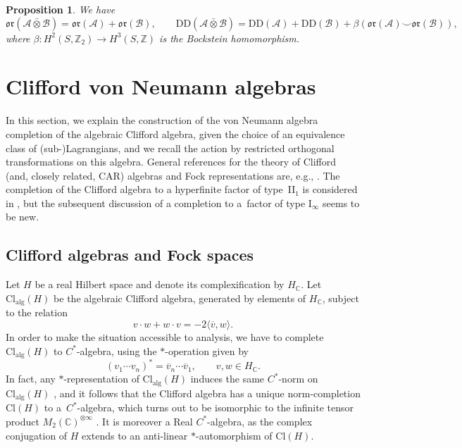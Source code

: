 \documentclass[10pt,a4paper]{amsart}
\numberwithin{equation}{section}
\newtheorem{Proposition}[Theorem]{Proposition}
\newcommand{\Z}{\mathbb{Z}}
\newcommand{\C}{\mathbb{C}}
\newcommand{\Cl}{\mathrm{Cl}}
\newcommand{\DD}{\mathrm{DD}}
\newcommand{\oclass}{\mathfrak{or}}
\begin{document}
\begin{Proposition} \label{PropTensorProductDD}
We have
\begin{equation*}
\oclass(\mathcal{A} \bar{\otimes}\mathcal{B}) = \oclass(\mathcal{A}) + \oclass(\mathcal{B}), \qquad \DD(\mathcal{A} \bar{\otimes}  \mathcal{B}) = \DD(\mathcal{A}) + \DD(\mathcal{B}) + \beta(\oclass(\mathcal{A}) \smile \oclass(\mathcal{B})),
\end{equation*}
where $\beta\colon H^2(S, \Z_2) \to H^3(S, \Z)$ is the Bockstein homomorphism.
\end{Proposition}

\section{Clifford von Neumann algebras}

In this section, we explain the construction of the von Neumann algebra completion of the algebraic Clifford algebra, given the choice of an equivalence class of (sub-)Lagrangians, and we recall the action by restricted orthogonal transformations on this algebra.
General references for the theory of Clifford (and, closely related, CAR) algebras and Fock representations are, e.g., \cite{Araki1,PlymenRobinson,PressleySegal,PreviatoSpera,ShaleStinespring,SperaWurzbacherSpinors,WurzbacherFermionicSecondQuantization}.
The completion of the Clifford algebra to a hyperfinite factor of type~II$_1$ is considered in \cite[Section~1.3]{PlymenRobinson}, but the subsequent discussion of a completion to a~factor of type I$_\infty$ seems to be new.

\subsection{Clifford algebras and Fock spaces} \label{SectionCliffordAlgebras}

Let $H$ be a real Hilbert space and denote its complexification by $H_\C$.
Let $\Cl_{\mathrm{alg}}(H)$ be the algebraic Clifford algebra, generated by elements of $H_\C$, subject to the relation
\begin{equation*}
 v \cdot w + w \cdot v = - 2 \langle \overline{v}, w\rangle.
\end{equation*}
In order to make the situation accessible to analysis, we have to complete $\Cl_{\mathrm{alg}}(H)$ to $C^*$-algebra, using the $*$-operation given by
\begin{equation*}
 (v_1\cdots v_n)^* = \overline{v}_n \cdots \overline{v}_1, \qquad v, w \in H_\C.
\end{equation*}
In fact, any $*$-representation of $\Cl_{\mathrm{alg}}(H)$ induces the same $C^*$-norm on $\Cl_{\mathrm{alg}}(H)$ \cite[Proposition~1]{ShaleStinespring}, and it follows that the Clifford algebra has a unique norm-completion $\Cl(H)$ to a~$C^*$-algebra, which turns out to be isomorphic to the infinite tensor product $M_2(\C)^{\otimes \infty}$ \cite{Araki1}.
It is moreover a Real $C^*$-algebra, as the complex conjugation of $H$ extends to an anti-linear $*$-automorphism of $\Cl(H)$.
\end{document}
